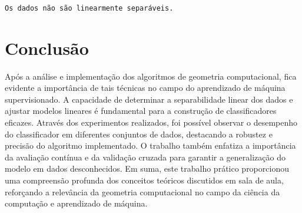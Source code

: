\documentclass[11pt]{article}
\begin{document}
    \begin{center}
    \end{center}
    { \hspace*{\fill} \\}
    
    \begin{center}
    \end{center}
    { \hspace*{\fill} \\}
    
    \begin{center}
    \end{center}
    { \hspace*{\fill} \\}
    
    \begin{Verbatim}[commandchars=\\\{\}]
Os dados não são linearmente separáveis.
    \end{Verbatim}

    \hypertarget{conclusuxe3o}{%
\section{Conclusão}\label{conclusuxe3o}}

Após a análise e implementação dos algoritmos de geometria
computacional, fica evidente a importância de tais técnicas no campo do
aprendizado de máquina supervisionado. A capacidade de determinar a
separabilidade linear dos dados e ajustar modelos lineares é fundamental
para a construção de classificadores eficazes. Através dos experimentos
realizados, foi possível observar o desempenho do classificador em
diferentes conjuntos de dados, destacando a robustez e precisão do
algoritmo implementado. O trabalho também enfatiza a importância da
avaliação contínua e da validação cruzada para garantir a generalização
do modelo em dados desconhecidos. Em suma, este trabalho prático
proporcionou uma compreensão profunda dos conceitos teóricos discutidos
em sala de aula, reforçando a relevância da geometria computacional no
campo da ciência da computação e aprendizado de máquina.


    
    
    
\end{document}
